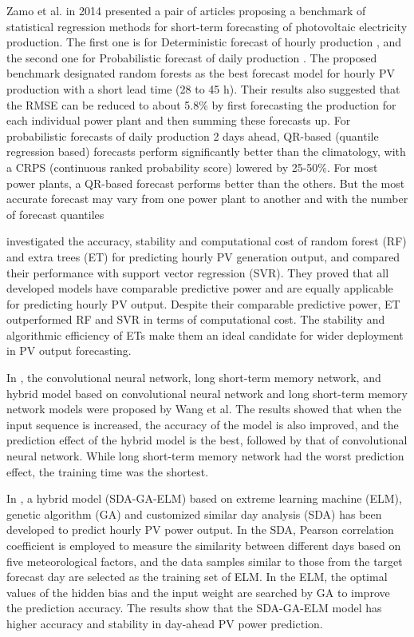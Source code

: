 Zamo et al. in 2014 presented a pair of articles proposing a benchmark of statistical regression methods for short-term forecasting of photovoltaic electricity production.
The first one is for Deterministic forecast of hourly production \cite{ZAMO2014792}, and the second one for Probabilistic forecast of daily production \cite{ZAMO2014804}.
The proposed benchmark designated random forests as the best forecast model for hourly PV production with a short lead time (28 to 45 h).
Their results also suggested that the RMSE can be reduced to about 5.8\% by first forecasting the production for each individual power plant and then summing these forecasts up.
For probabilistic forecasts of daily production 2 days ahead, QR-based (quantile regression based) forecasts perform significantly better than the climatology, with a CRPS (continuous ranked probability score) lowered by 25-50\%.
For most power plants, a QR-based forecast performs better than the others.
But the most accurate forecast may vary from one power plant to another and with the number of forecast quantiles

\cite{AHMAD2018465} investigated the accuracy, stability and computational cost of random forest (RF) and extra trees (ET) for predicting hourly PV generation output, and compared their performance with support vector regression (SVR).
They proved that all developed models have comparable predictive power and are equally applicable for predicting hourly PV output.
Despite their comparable predictive power, ET outperformed RF and SVR in terms of computational cost.
The stability and algorithmic efficiency of ETs make them an ideal candidate for wider deployment in PV output forecasting.

 In \cite{WANG2019113315}, the convolutional neural network, long short-term memory network, and hybrid model based on convolutional neural network and long short-term memory network models were proposed by Wang et al.
The results showed that when the input sequence is increased, the accuracy of the model is also improved, and the prediction effect of the hybrid model is the best, followed by that of convolutional neural network.
While long short-term memory network had the worst prediction effect, the training time was the shortest.

In \cite{ZHOU2020117894}, a hybrid model (SDA-GA-ELM) based on extreme learning machine (ELM), genetic algorithm (GA) and customized similar day analysis (SDA) has been developed to predict hourly PV power output.
In the SDA, Pearson correlation coefficient is employed to measure the similarity between different days based on five meteorological factors, and the data samples similar to those from the target forecast day are selected as the training set of ELM.
In the ELM, the optimal values of the hidden bias and the input weight are searched by GA to improve the prediction accuracy.
The results show that the SDA-GA-ELM model has higher accuracy and stability in day-ahead PV power prediction.


